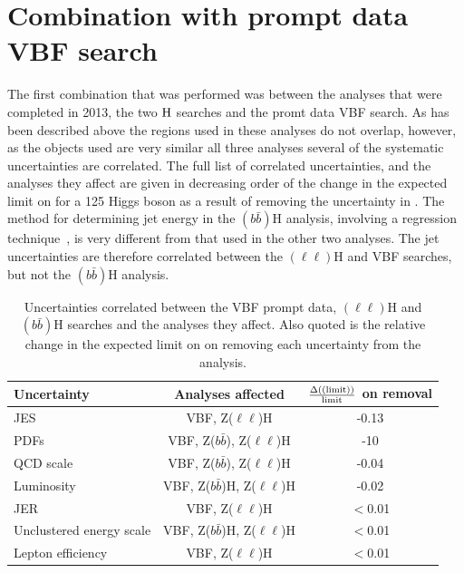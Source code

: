 \section{Combination with prompt data VBF search}
\label{sec:combprompt}
The first combination that was performed was between the analyses that were completed in 2013, the two \PZ$\rm{H}$ searches and the promt data \ac{VBF} search. As has been described above the regions used in these analyses do not overlap, however, as the objects used are very similar all three analyses several of the systematic uncertainties are correlated. The full list of correlated uncertainties, and the analyses they affect are given in decreasing order of the change in the expected limit on \BRinv for a 125 \GeV Higgs boson as a result of removing the uncertainty in . The method for determining jet energy in the \PZ$(b\bar{b})$H analysis, involving a regression technique~\cite{CMS-PAS-HIG-13-028}, is very different from that used in the other two analyses. The jet uncertainties are therefore correlated between the \PZ$(\ell\ell)$H and \ac{VBF} searches, but not the \PZ$(b\bar{b})$H analysis.

\begin{table}
  \caption{Uncertainties correlated between the \ac{VBF} prompt data, \PZ$(\ell\ell)$H and \PZ$(b\bar{b})$H searches and the analyses they affect. Also quoted is the relative change in the expected limit on \BRinv on removing each uncertainty from the analysis.}
  \label{tab:promptcorrs}
  \begin{tabular}{lcc}
    \hline
    \hline
    Uncertainty & Analyses affected & $\frac{\Delta(\rm(limit))}{\rm{limit}}$ on removal \\
    \hline
    \ac{JES} & VBF, Z($\ell\ell$)H & -0.13 \\
    PDFs & VBF, Z($b\bar{b}$), Z($\ell\ell$)H & -10 \\
    QCD scale & VBF, Z($b\bar{b}$), Z($\ell\ell$)H & -0.04\\
    Luminosity & VBF, Z($b\bar{b}$)H, Z($\ell\ell$)H & -0.02\\
    \ac{JER} & VBF, Z($\ell\ell$)H & $<$0.01\\
    Unclustered energy scale & VBF, Z($b\bar{b}$)H, Z($\ell\ell$)H & $<$0.01\\
    Lepton efficiency & VBF, Z($\ell\ell$)H & $<$0.01\\
    \hline
    \hline
  \end{tabular}
\end{table}


